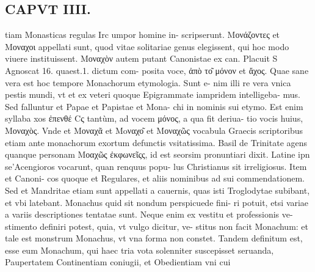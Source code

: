\documentclass{article}
\begin{document}
\begin{pages}
\section*{CAPVT  IIII. }
\marginpar{[ p.213 ]}\pstart tiam Monasticas regulas Irc umpor homine in- scripserunt.  \pend\pstart Μονάζοντες et Μοναχοι appellati sunt, quod vitae solitariae genus elegissent, qui hoc modo viuere instituissent. Μοναχὸν autem putant Canonistae ex can. Placuit S Agnoscat 16. quaest.1. dictum com- posita voce, ἀπὸ το͂ μόνον et ἄχος. Quae sane vera est hoc tempore Monachorum etymologia. Sunt e- nim illi re vera vnica pestis mundi, vt et ex veteri quoque Epigrammate iampridem intelligeba- mus. Sed falluntur et Papae et Papistae et Mona- chi in nominis sui etymo. Est enim syllaba xos ἐπενθέ Cς tantùm, ad vocem μόνος, a qua fit deriua- tio vocis huius, Μοναχὸς. Vnde et Μοναχᾶ et Moναχο͂ et Μοναχῶς vocabula Graecis scriptoribus etiam ante monachorum exortum defunctis vsitatissima. Basil de Trinitate agens quanque  personam Μοαχῶς ἐκφωνεῖςς, id est seorsim pronuntiari dixit. Latine ipn se’Acengioros vocarunt, quan renquus popu- lus Christianus sit irreligiosus. Item et Canoni- cos quoque et Regulares, et aliis nominibus ad sui commendationem. Sed et Mandritae etiam sunt appellati a cauernis, quas isti Troglodytae subibant, et vbi latebant.  \pend\pstart Monachus quid sit nondum perspicuede fini- ri potuit, etsi variae a variis descriptiones tentatae sunt. Neque enim ex vestitu et professionis ve- stimento definiri potest, quia, vt vulgo dicitur, ve- stitus non facit Monachum: et tale est monstrum Monachus, vt vna forma non constet. Tandem definitum est, esse eum Monachum, qui haec tria vota solenniter suscepisset seruanda, Paupertatem Continentiam coniugii, et Obedientiam vni cui  \pend

\end{pages}
\end{document}
